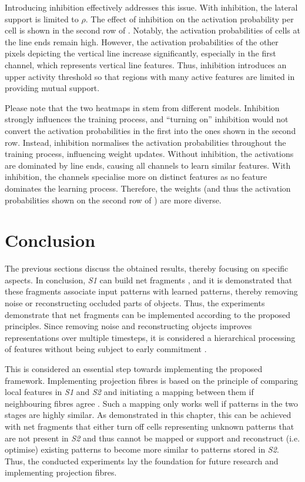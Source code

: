 Introducing inhibition effectively addresses this issue.
With inhibition, the lateral support is limited to $\rho$.
The effect of inhibition on the activation probability per cell is shown in the second row of .
Notably, the activation probabilities of cells at the line ends remain high. However, the activation probabilities of the other pixels depicting the vertical line increase significantly, especially in the first channel, which represents vertical line features.
Thus, inhibition introduces an upper activity threshold so that regions with many active features are limited in providing mutual support.

Please note that the two heatmaps in  stem from different models.
Inhibition strongly influences the training process, and ``turning on'' inhibition would not convert the activation probabilities in the first into the ones shown in the second row.
Instead, inhibition normalises the activation probabilities throughout the training process, influencing weight updates.
Without inhibition, the activations are dominated by line ends, causing all channels to learn similar features.
With inhibition, the channels specialise more on distinct features as no feature dominates the learning process. Therefore, the weights (and thus the activation probabilities shown on the second row of ) are more diverse.

\section{Conclusion}
The previous sections discuss the obtained results, thereby focusing on specific aspects.
In conclusion, \emph{S1} can build net fragments , and it is demonstrated that these fragments associate input patterns with learned patterns, thereby removing noise or reconstructing occluded parts of objects.
Thus, the experiments demonstrate that net fragments can be implemented according to the proposed principles.
Since removing noise and reconstructing objects improves representations over multiple timesteps, it is considered a hierarchical processing of features without being subject to early commitment .

This is considered an essential step towards implementing the proposed framework.
Implementing projection fibres  is based on the principle of comparing local features in \emph{S1} and \emph{S2} and initiating a mapping between them if neighbouring fibres agree .
Such a mapping only works well if patterns in the two stages are highly similar.
As demonstrated in this chapter, this can be achieved with net fragments that either turn off cells representing unknown patterns that are not present in \emph{S2} and thus cannot be mapped or support and reconstruct (i.e. optimise) existing patterns to become more similar to patterns stored in \emph{S2}.
Thus, the conducted experiments lay the foundation for future research and implementing projection fibres.
